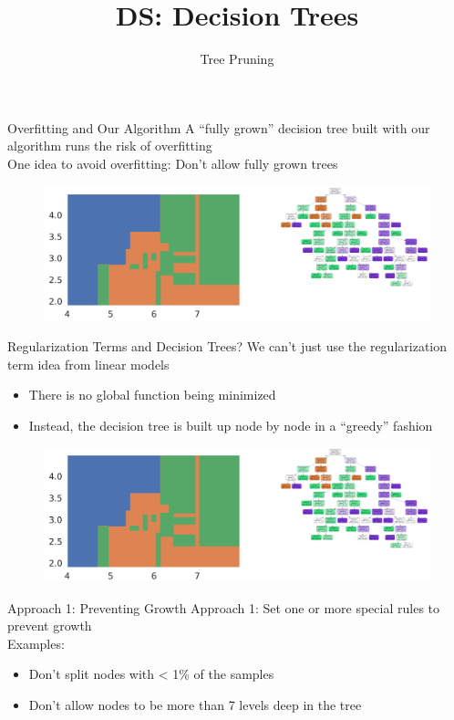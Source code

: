 \documentclass[aspectratio=169]{../latex_main/tntbeamer}  %
\title[Pruning]{DS: Decision Trees}
\subtitle{Tree Pruning}
\begin{document}
	
	\maketitle
	\begin{frame}{Overfitting and Our Algorithm}
	    A “fully grown” decision tree built with our algorithm runs the risk of overfitting\\
	    \bigskip
	    One idea to avoid overfitting: Don’t allow fully grown trees
	    \begin{figure}
	        \centering
	        \includegraphics[scale=.45]{Bild52}
	    \end{figure}
	\end{frame}
	
	\begin{frame}{Regularization Terms and Decision Trees?}
	    We can’t just use the regularization term idea from linear models
	    \begin{itemize}
	        \item There is no global function being minimized
	        \item Instead, the decision tree is built up node by node in a “greedy” fashion
	    \end{itemize}
	    \begin{figure}
	        \centering
	        \includegraphics[scale=.45]{Bild52}
	    \end{figure}
	\end{frame}
	
	
	\begin{frame}{Approach 1: Preventing Growth}
	    Approach 1: Set one or more special rules to prevent growth\\
	    \bigskip
	    Examples:
	    \begin{itemize}
	        \item Don’t split nodes with < 1\% of the samples  
	        \item Don’t allow nodes to be more than 7 levels deep in the tree
	    \end{itemize}
	\end{frame}
	
\end{document}
